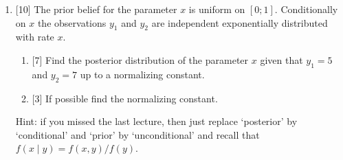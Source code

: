 \documentclass[12pt]{article}
\begin{document}
\begin{enumerate}
    \item {[10]} The prior belief for the parameter $x$ is uniform on $[0; 1]$. 
    Conditionally on $x$ the observations $y_1$ and $y_2$ are independent exponentially distributed with rate $x$.

    \begin{enumerate}
        \item {[7]} Find the posterior distribution of the parameter $x$ given that $y_1 = 5$ and $y_2 = 7$ up to a normalizing constant.
        \item {[3]} If possible find the normalizing constant. 
    \end{enumerate}

    Hint: if you missed the last lecture, 
    then just replace `posterior' by `conditional' and `prior' by `unconditional' and recall that $f(x \mid y) = f(x, y) / f(y)$.

 
    
    

    



\end{enumerate}
\end{document}

